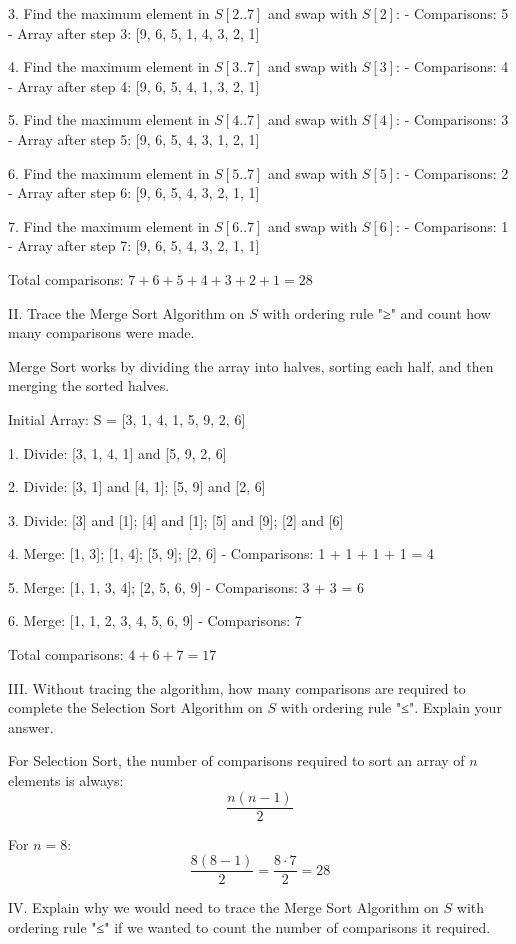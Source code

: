 \documentclass{article}
\begin{document}
	3. Find the maximum element in \( S[2..7] \) and swap with \( S[2] \):
	- Comparisons: 5
	- Array after step 3: [9, 6, 5, 1, 4, 3, 2, 1]
	
	4. Find the maximum element in \( S[3..7] \) and swap with \( S[3] \):
	- Comparisons: 4
	- Array after step 4: [9, 6, 5, 4, 1, 3, 2, 1]
	
	5. Find the maximum element in \( S[4..7] \) and swap with \( S[4] \):
	- Comparisons: 3
	- Array after step 5: [9, 6, 5, 4, 3, 1, 2, 1]
	
	6. Find the maximum element in \( S[5..7] \) and swap with \( S[5] \):
	- Comparisons: 2
	- Array after step 6: [9, 6, 5, 4, 3, 2, 1, 1]
	
	7. Find the maximum element in \( S[6..7] \) and swap with \( S[6] \):
	- Comparisons: 1
	- Array after step 7: [9, 6, 5, 4, 3, 2, 1, 1]
	
	Total comparisons: \( 7 + 6 + 5 + 4 + 3 + 2 + 1 = 28 \)
	
	II. Trace the Merge Sort Algorithm on \( S \) with ordering rule "≥" and count how many comparisons were made.
	
	Merge Sort works by dividing the array into halves, sorting each half, and then merging the sorted halves.
	
	Initial Array: S = [3, 1, 4, 1, 5, 9, 2, 6]
	
	1. Divide: [3, 1, 4, 1] and [5, 9, 2, 6]
	
	2. Divide: [3, 1] and [4, 1]; [5, 9] and [2, 6]
	
	3. Divide: [3] and [1]; [4] and [1]; [5] and [9]; [2] and [6]
	
	4. Merge: [1, 3]; [1, 4]; [5, 9]; [2, 6]
	- Comparisons: 1 + 1 + 1 + 1 = 4
	
	5. Merge: [1, 1, 3, 4]; [2, 5, 6, 9]
	- Comparisons: 3 + 3 = 6
	
	6. Merge: [1, 1, 2, 3, 4, 5, 6, 9]
	- Comparisons: 7
	
	Total comparisons: \( 4 + 6 + 7 = 17 \)
	
	III. Without tracing the algorithm, how many comparisons are required to complete the Selection Sort Algorithm on \( S \) with ordering rule "≤". Explain your answer.
	
	For Selection Sort, the number of comparisons required to sort an array of \( n \) elements is always:
	\[ \frac{n(n-1)}{2} \]
	
	For \( n = 8 \):
	\[ \frac{8(8-1)}{2} = \frac{8 \cdot 7}{2} = 28 \]
	
	IV. Explain why we would need to trace the Merge Sort Algorithm on \( S \) with ordering rule "≤" if we wanted to count the number of comparisons it required.
	
\end{document}
